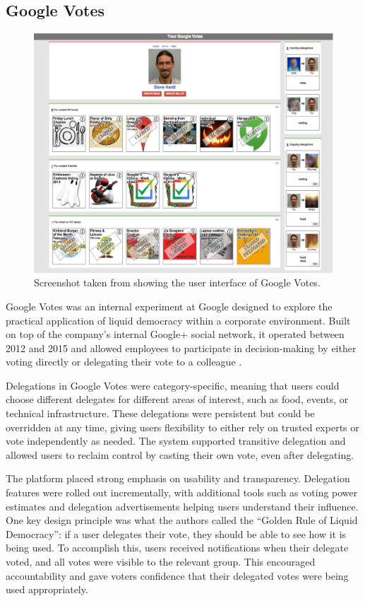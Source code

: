 \subsection{Google Votes}
\begin{figure}[H]
  \centering
  \includegraphics[width=0.8\linewidth]{../common/google_votes.png}
  \caption{Screenshot taken from \citet{hardt_google_2015} showing the user interface of Google Votes.}
\end{figure}

Google Votes was an internal experiment at Google designed to explore the practical application of liquid democracy within a corporate environment. Built on top of the company's internal Google+ social network, it operated between 2012 and 2015 and allowed employees to participate in decision-making by either voting directly or delegating their vote to a colleague \citep{hardt_google_2015}.

Delegations in Google Votes were category-specific, meaning that users could choose different delegates for different areas of interest, such as food, events, or technical infrastructure. These delegations were persistent but could be overridden at any time, giving users flexibility to either rely on trusted experts or vote independently as needed. The system supported transitive delegation and allowed users to reclaim control by casting their own vote, even after delegating.

The platform placed strong emphasis on usability and transparency. Delegation features were rolled out incrementally, with additional tools such as voting power estimates and delegation advertisements helping users understand their influence. One key design principle was what the authors called the ``Golden Rule of Liquid Democracy'': if a user delegates their vote, they should be able to see how it is being used. To accomplish this, users received notifications when their delegate voted, and all votes were visible to the relevant group. This encouraged accountability and gave voters confidence that their delegated votes were being used appropriately.

